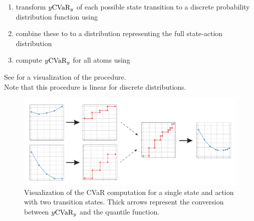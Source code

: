 \begin{enumerate}
\item transform $y \text{CVaR}_y$ of each possible state transition to a discrete probability distribution function using 
\item combine these to to a distribution representing the full state-action distribution
\item compute $y \text{CVaR}_y$ for all atoms using 
\end{enumerate}
See  for a visualization of the procedure. 
\\
Note that this procedure is linear for discrete distributions. 

\begin{figure}
\center
\includegraphics[width=\linewidth]{gfx/cvar_vi_conversion.pdf}
\caption{Visualization of the CVaR computation for a single state and action with two transition states. Thick arrows represent the conversion between $y\text{CVaR}_y$ and the quantile function.}
\label{fig:cvarcomputation}
\end{figure}




